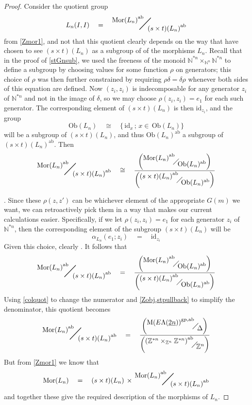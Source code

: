 \documentclass{amsbook} %
\newcommand{\quotient}[2]{ \raisebox{0.5\height}{$#1$} \mkern-5mu\diagup\mkern-4mu \raisebox{-0.5\height}{$#2$} }
\newcommand{\bigquotient}[2]{ \raisebox{0.75\height}{$#1$} \mkern-12mu\scalebox{2}{$\diagup$}\mkern-10mu \raisebox{-0.5\height}{$#2$} }
\newcommand{\ELnn}{E\Lambda(\underline{2n})}
\numberwithin{section}{chapter}
\begin{document}
\begin{proof}
Consider the quotient group
\[ L_n(I,I) \quad = \quad \bigquotient{{\mathrm{Mor}(L_n)}^{\mathrm{ab}}}{{(s \times t)(L_n)}^{\mathrm{ab}}} \]
from \cref{Zmor1}, and not that this quotient clearly depends on the way that have chosen to see $(s \times t)(L_n)$ as a subgroup of of the morphisms $L_n$. Recall that  in the proof of \cref{stGnsub}, we used the freeness of the monoid $\mathbb{N}^{\ast n} \times_{\mathbb{N}^n} \mathbb{N}^{\ast n}$ to define a subgroup by choosing values for some function $\rho$ on generators; this choice of $\rho$ was then further constrained by requiring $\rho \delta = \delta \rho$ whenever both sides of this equation are defined. Now $(z_i, z_i)$ is indecomposable for any generator $z_i$ of $\mathbb{N}^{*n}$ and not in the image of $\delta$, so we may choose $\rho(z_i, z_i) = e_1$ for each such generator. The corresponding element of $(s \times t)(L_n)$ is then $\mathrm{id}_{z_i}$, and the group
\[ \mathrm{Ob}(L_n) \quad \cong \quad \{ \, \mathrm{id}_x \, ; \, x \in \, \mathrm{Ob}(L_n) \}\]
will be a subgroup of $(s \times t)(L_n)$, and thus $\mathrm{Ob}(L_n)^{\mathrm{ab}}$ a subgroup of $(s \times t)(L_n)^{\mathrm{ab}}$. Then 
\[ \bigquotient{{\mathrm{Mor}(L_n)}^{\mathrm{ab}}}{{(s \times t)(L_n)}^{\mathrm{ab}}} \quad \cong \quad \frac{\left(\quotient{{\mathrm{Mor}(L_n)}^{\mathrm{ab}}}{\mathrm{Ob}(L_n)^{\mathrm{ab}}}\right)}{\left(\quotient{{(s \times t)(L_n)}^{\mathrm{ab}}}{\mathrm{Ob}(L_n)^{\mathrm{ab}}}\right)} \]




. Since these $\rho(z,z')$ can be whichever element of the appropriate $G(m)$ we want, we can retroactively pick them in a way that makes our current calculations easier. Specifically, if we let $\rho(z_i, z_i) = e_1$ for each generator $z_i$ of $\mathbb{N}^{\ast n}$, then the corresponding element of the subgroup $(s \times t)(L_n)$ will be
\[ \alpha_{L_n}(e_1;z_i) \quad = \quad \mathrm{id}_{z_i}\]
Given this choice, clearly . It follows that
\[ \bigquotient{{\mathrm{Mor}(L_n)}^{\mathrm{ab}}}{{(s \times t)(L_n)}^{\mathrm{ab}}} \quad = \quad \frac{\left(\quotient{{\mathrm{Mor}(L_n)}^{\mathrm{ab}}}{\mathrm{Ob}(L_n)^{\mathrm{ab}}}\right)}{\left(\quotient{{(s \times t)(L_n)}^{\mathrm{ab}}}{\mathrm{Ob}(L_n)^{\mathrm{ab}}}\right)} \]
Using \cref{colquot} to change the numerator and \cref{Zobj,stpullback} to simplify the denominator, this quotient becomes
\[ \bigquotient{{\mathrm{Mor}(L_n)}^{\mathrm{ab}}}{{(s \times t)(L_n)}^{\mathrm{ab}}} \quad = \quad \frac{\left(\quotient{{\mathrm{M}(\ELnn)}^{\mathrm{gp},\mathrm{ab}}}{\Delta}\right)}{\left(\quotient{{(\mathbb{Z}^{\ast n} \times_{\mathbb{Z}^n} \mathbb{Z}^{\ast n})}^{\mathrm{ab}}}{\mathbb{Z}^n}\right)} \]
But from \cref{Zmor1} we know that
\[ \mathrm{Mor}(L_n) \quad = \quad (s \times t)(L_n) \, \times \, \bigquotient{{\mathrm{Mor}(L_n)}^{\mathrm{ab}}}{{(s \times t)(L_n)}^{\mathrm{ab}}} \]
and together these give the required description of the morphisms of $L_n$.
\end{proof}
\end{document}
